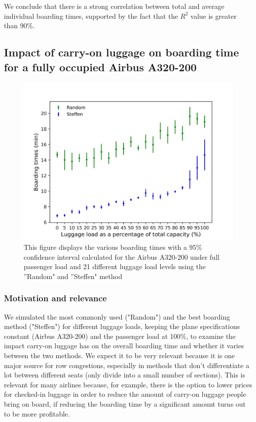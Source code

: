 \documentclass[11pt]{article}
\begin{document}
	We conclude that there is a strong correlation between total and average individual boarding times, supported by the fact that the $R^2$ value is greater than 90\%.

\subsection{Impact of carry-on luggage on boarding time for a fully occupied Airbus A320-200}
	\begin{figure}
		\includegraphics[width=\linewidth]{../../code/AirplaneBoarding/data/figure4/figure4.png}
		\caption{This figure displays the various boarding times with a 95\% confidence interval calculated for the Airbus A320-200 under full passenger load and 21 different luggage load levels using the ''Random" and ''Steffen" method}
		\label{figure4}
	\end{figure}
	\subsubsection{Motivation and relevance}
	We simulated the most commonly used ("Random") and the best boarding method ("Steffen") for different luggage loads, keeping the plane specifications constant (Airbus A320-200) and the passenger load at 100\%, to examine the impact carry-on luggage has on the overall boarding time and whether it varies between the two methods. We expect it to be very relevant because it is one major source for row congestions, especially in methods that don't differentiate a lot between different seats (only divide into a small number of sections). This is relevant for many airlines because, for example, there is the option to lower prices for checked-in luggage in order to reduce the amount of carry-on luggage people bring on board, if reducing the boarding time by a significant amount turns out to be more profitable.
	
\end{document}
